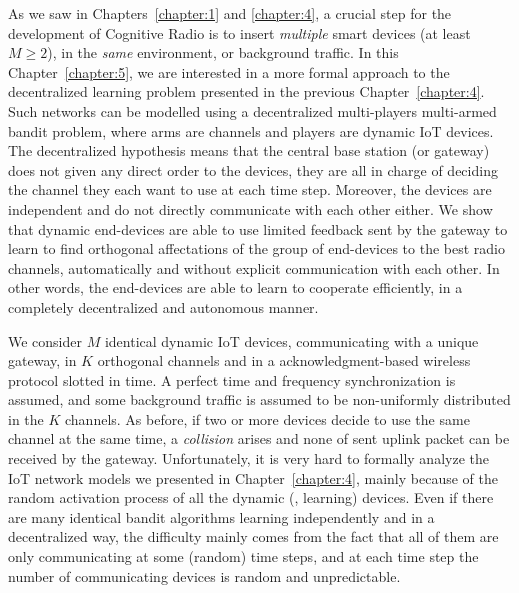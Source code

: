 As we saw in Chapters~\ref{chapter:1} and \ref{chapter:4},
a crucial step for the development of Cognitive Radio is to insert \emph{multiple} smart devices (at least $M \geq 2$), in the \emph{same} environment, or background traffic.
%
In this Chapter~\ref{chapter:5}, we are interested in a more formal approach to the decentralized learning problem presented in the previous Chapter~\ref{chapter:4}.
Such networks can be modelled using a decentralized multi-players multi-armed bandit problem, where arms are channels and players are dynamic IoT devices.
%
The decentralized hypothesis means that the central base station (or gateway) does not given any direct order to the devices, they are all in charge of deciding the channel they each want to use at each time step.
Moreover, the devices are independent and do not directly communicate with each other either.
We show that dynamic end-devices are able to use limited feedback sent by the gateway  to learn to find orthogonal affectations of the group of end-devices to the best radio channels, automatically and without explicit communication with each other.
In other words, the end-devices are able to learn to cooperate efficiently, in a completely decentralized and autonomous manner.


We consider $M$ identical dynamic IoT devices, communicating with a unique gateway, in $K$ orthogonal channels and in a acknowledgment-based wireless protocol slotted in time.
A perfect time and frequency synchronization is assumed,
and some \iid{} background traffic is assumed to be non-uniformly distributed in the $K$ channels.
As before, if two or more devices decide to use the same channel at the same time, a \emph{collision} arises and none of sent uplink packet can be received by the gateway.
%
Unfortunately, it is very hard to formally analyze the IoT network models we presented in Chapter~\ref{chapter:4}, mainly because of the random activation process of all the dynamic (\ie, learning) devices.
Even if there are many identical bandit algorithms learning independently and in a decentralized way, the difficulty mainly comes from the fact that all of them are only communicating at some (random) time steps, and at each time step the number of communicating devices is random and unpredictable.


